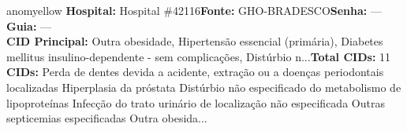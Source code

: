 \documentclass[a4paper,10pt]{article}
\begin{document}
\begin{anomalycard}[Interna\c{c}\~{a}o \#120150 | Pac. \#99614 | MODERADO (z=2.77) | LOS: 7d | 02/03/2026\,$\to$\,09/03/2026]{anomyellow}
\textbf{Hospital:} Hospital \#42116\quad \textbf{Fonte:} GHO-BRADESCO\quad \textbf{Senha:} ---\quad \textbf{Guia:} ---\\

\textbf{CID Principal:} {\small Outra obesidade, Hipertensão essencial (primária), Diabetes mellitus insulino-dependente - sem complicações, Distúrbio n...}\quad\textbf{Total CIDs:} 11\\

\textbf{CIDs:} {\scriptsize Perda de dentes devida a acidente, extração ou a doenças periodontais localizadas \textbar{} Hiperplasia da próstata \textbar{} Distúrbio não especificado do metabolismo de lipoproteínas \textbar{} Infecção do trato urinário de localização não especificada \textbar{} Outras septicemias especificadas \textbar{} Outra obesida...}\\




\end{anomalycard}
\end{document}
